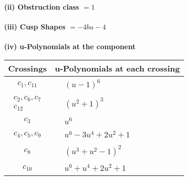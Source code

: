 \documentclass[1p]{elsarticle_modified}
\theoremstyle{definition}
\begin{document}
\flushleft \textbf{(ii) Obstruction class $= 1$}\\~\\
\flushleft \textbf{(iii) Cusp Shapes $= -4 b u-4$}\\~\\
\newpage\renewcommand{\arraystretch}{1}
\flushleft \textbf{(iv) u-Polynomials at the component}\newline \\
\begin{tabular}{m{50pt}|m{274pt}}
Crossings & \hspace{64pt}u-Polynomials at each crossing \\
\hline $$\begin{aligned}c_{1},c_{11}\end{aligned}$$&$\begin{aligned}
&(u-1)^6
\end{aligned}$\\
\hline $$\begin{aligned}c_{2},c_{6},c_{7}\\c_{12}\end{aligned}$$&$\begin{aligned}
&(u^2+1)^3
\end{aligned}$\\
\hline $$\begin{aligned}c_{3}\end{aligned}$$&$\begin{aligned}
&u^6
\end{aligned}$\\
\hline $$\begin{aligned}c_{4},c_{5},c_{9}\end{aligned}$$&$\begin{aligned}
&u^6-3 u^4+2 u^2+1
\end{aligned}$\\
\hline $$\begin{aligned}c_{8}\end{aligned}$$&$\begin{aligned}
&(u^3+u^2-1)^2
\end{aligned}$\\
\hline $$\begin{aligned}c_{10}\end{aligned}$$&$\begin{aligned}
&u^6+u^4+2 u^2+1
\end{aligned}$\\
\hline
\end{tabular}\\~\\
\end{document}
